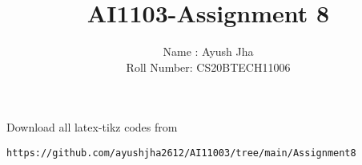 \documentclass[journal,12pt,twocolumn]{IEEEtran}
\DeclareMathOperator*{\Res}{Res}
\theoremstyle{definition}
\begin{document}
\newcommand{\Int}{\int\limits}
\newcommand{\BEQA}{\begin{eqnarray}}
\newcommand{\EEQA}{\end{eqnarray}}
\newcommand{\define}{\stackrel{\triangle}{=}}

\raggedbottom
\setlength{\parindent}{0pt}
\providecommand{\mbf}{\mathbf}
\providecommand{\pr}[1]{\ensuremath{\Pr\left(#1\right)}}
\providecommand{\qfunc}[1]{\ensuremath{Q\left(#1\right)}}
\providecommand{\sbrak}[1]{\ensuremath{{}\left[#1\right]}}
\providecommand{\lsbrak}[1]{\ensuremath{{}\left[#1\right.}}
\providecommand{\rsbrak}[1]{\ensuremath{{}\left.#1\right]}}
\providecommand{\brak}[1]{\ensuremath{\left(#1\right)}}
\providecommand{\lbrak}[1]{\ensuremath{\left(#1\right.}}
\providecommand{\rbrak}[1]{\ensuremath{\left.#1\right)}}
\providecommand{\cbrak}[1]{\ensuremath{\left\{#1\right\}}}
\providecommand{\lcbrak}[1]{\ensuremath{\left\{#1\right.}}
\providecommand{\rcbrak}[1]{\ensuremath{\left.#1\right\}}}
\theoremstyle{remark}
\newtheorem{rem}{Remark}
\newcommand{\sgn}{\mathop{\mathrm{sgn}}}
\providecommand{\abs}[1]{\vert#1\vert}
\providecommand{\res}[1]{\Res\displaylimits_{#1}} 
\providecommand{\norm}[1]{\lVert#1\rVert}
\providecommand{\mtx}[1]{\mathbf{#1}}
\providecommand{\mean}[1]{E[ #1 ]}
\providecommand{\fourier}{\overset{\mathcal{F}}{ \rightleftharpoons}}
\providecommand{\system}{\overset{\mathcal{H}}{ \longleftrightarrow}}
\newcommand{\solution}{\noindent \textbf{Solution: }}
\newcommand{\cosec}{\,\text{cosec}\,}
\providecommand{\dec}[2]{\ensuremath{\overset{#1}{\underset{#2}{\gtrless}}}}
\newcommand{\myvec}[1]{\ensuremath{\begin{pmatrix}#1\end{pmatrix}}}
\newcommand{\mydet}[1]{\ensuremath{\begin{vmatrix}#1\end{vmatrix}}}
\makeatletter
{}
\makeatother
\let\StandardTheFigure\thefigure
\let\vec\mathbf
\renewcommand{\thefigure}{\theproblem}
\def\putbox#1#2#3{\makebox[0in][l]{\makebox[#1][l]{}\raisebox{\baselineskip}[0in][0in]{\raisebox{#2}[0in][0in]{#3}}}}
     \def\rightbox#1{\makebox[0in][r]{#1}}
     \def\centbox#1{\makebox[0in]{#1}}
     \def\topbox#1{\raisebox{-\baselineskip}[0in][0in]{#1}}
     \def\midbox#1{\raisebox{-0.5\baselineskip}[0in][0in]{#1}}
\vspace{3cm}
\title{AI1103-Assignment 8}
\author{Name : Ayush Jha \\ Roll Number: CS20BTECH11006}
\maketitle
\newpage
\bigskip
\renewcommand{\thefigure}{\theenumi}
\renewcommand{\thetable}{\theenumi}
Download all latex-tikz codes from 
%
\begin{lstlisting}
https://github.com/ayushjha2612/AI11003/tree/main/Assignment8
\end{lstlisting}
\end{document}
